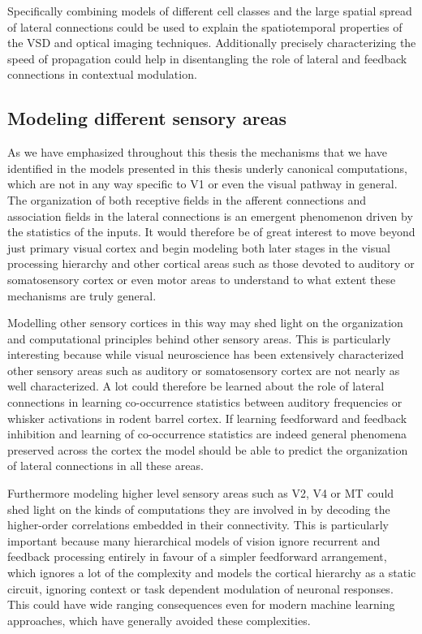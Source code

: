 Specifically combining models of different cell classes and the large
spatial spread of lateral connections could be used to explain the
spatiotemporal properties of the VSD and optical imaging
techniques. Additionally precisely characterizing the speed of
propagation could help in disentangling the role of lateral and
feedback connections in contextual modulation.

\subsection{Modeling different sensory areas}

As we have emphasized throughout this thesis the mechanisms that we
have identified in the models presented in this thesis underly
canonical computations, which are not in any way specific to V1 or
even the visual pathway in general. The organization of both receptive
fields in the afferent connections and association fields in the
lateral connections is an emergent phenomenon driven by the statistics
of the inputs. It would therefore be of great interest to move beyond
just primary visual cortex and begin modeling both later stages in the
visual processing hierarchy and other cortical areas such as those
devoted to auditory or somatosensory cortex or even motor areas to
understand to what extent these mechanisms are truly general.

Modelling other sensory cortices in this way may shed light on the
organization and computational principles behind other sensory
areas. This is particularly interesting because while visual
neuroscience has been extensively characterized other sensory areas
such as auditory or somatosensory cortex are not nearly as well
characterized. A lot could therefore be learned about the role of
lateral connections in learning co-occurrence statistics between
auditory frequencies or whisker activations in rodent barrel
cortex. If learning feedforward and feedback inhibition and learning
of co-occurrence statistics are indeed general phenomena preserved
across the cortex the model should be able to predict the organization
of lateral connections in all these areas.

Furthermore modeling higher level sensory areas such as V2, V4 or MT
could shed light on the kinds of computations they are involved in by
decoding the higher-order correlations embedded in their
connectivity. This is particularly important because many hierarchical
models of vision ignore recurrent and feedback processing entirely in
favour of a simpler feedforward arrangement, which ignores a lot of
the complexity and models the cortical hierarchy as a static circuit,
ignoring context or task dependent modulation of neuronal
responses. This could have wide ranging consequences even for modern
machine learning approaches, which have generally avoided these
complexities.


